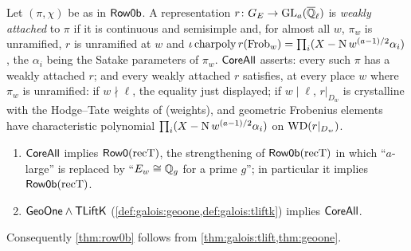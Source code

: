 \begin{definition}\label{def:galois:core}
Let $(\pi,\chi)$ be as in $\mathsf{Row0b}$. A representation $r\colon G_E\to\operatorname{GL}_a(\overline{\mathbb{Q}}_\ell)$ is
\emph{weakly attached} to $\pi$ if it is continuous and semisimple and, for almost all $w$, $\pi_w$ is
unramified, $r$ is unramified at $w$ and
$\iota\,\mathrm{charpoly}\,r(\operatorname{Frob}_w)=\prod_i(X-\operatorname{N} w^{(a-1)/2}\alpha_i)$, the $\alpha_i$ being the Satake
parameters of $\pi_w$. $\mathsf{CoreAll}$ asserts: every such $\pi$ has a weakly attached $r$; and every
weakly attached $r$ satisfies, at every place $w$ where $\pi_w$ is unramified: if $w\nmid\ell$, the
equality just displayed; if $w\mid\ell$, $r|_{D_w}$ is crystalline with the Hodge--Tate weights of
(weights), and geometric Frobenius elements have characteristic polynomial
$\prod_i(X-\operatorname{N} w^{(a-1)/2}\alpha_i)$ on $\mathrm{WD}(r|_{D_w})$.
\end{definition}

\begin{theorem}\Fmark\label{thm:galois:reduction}
\begin{enumerate}[label=(\alph*),nosep]
\item $\mathsf{CoreAll}$ implies $\mathsf{Row0}(\mathrm{recT})$, the strengthening of
  $\mathsf{Row0b}(\mathrm{recT})$ in which ``$a$-large'' is replaced by ``$E_w\cong\mathbb{Q}_g$ for a prime $g$'';
  in particular it implies $\mathsf{Row0b}(\mathrm{recT})$.
\item $\mathsf{GeoOne}\wedge\mathsf{TLiftK}$ (\cref{def:galois:geoone,def:galois:tliftk}) implies
  $\mathsf{CoreAll}$.
\end{enumerate}
Consequently \cref{thm:row0b} follows from \cref{thm:galois:tlift,thm:geoone}.
\end{theorem}

